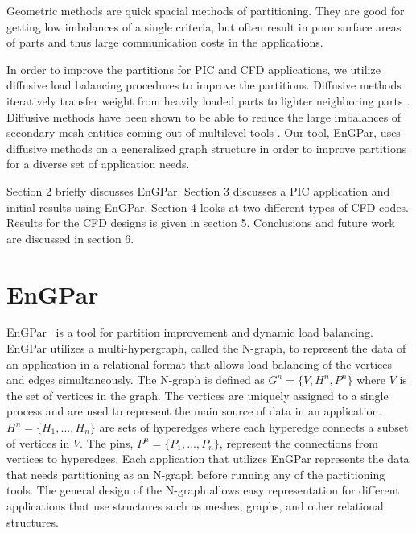 \documentclass[conference]{IEEEtran}
\begin{document}
Geometric methods are quick spacial methods of partitioning. They are good for getting low
imbalances of a single criteria, but often result in poor surface areas of parts and thus large
communication costs in the applications.

In order to improve the partitions for PIC and CFD applications, we utilize diffusive
load balancing procedures to improve the partitions. Diffusive methods iteratively transfer
weight from heavily loaded parts to lighter neighboring parts
\cite{cybenko1989dynamic,subramanian1994analysis}. Diffusive methods have been shown to be
able to reduce the large imbalances of secondary mesh entities coming out of multilevel
tools \cite{SmithParma2015}. Our tool, EnGPar, uses diffusive methods on a
generalized graph structure in order to improve partitions for a diverse set of application needs.

Section 2 briefly discusses EnGPar. Section 3 discusses a PIC application and initial results
using EnGPar. Section 4 looks at two different types of CFD codes. Results for the CFD
designs is given in section 5. Conclusions and future work are discussed in section 6.

\section{EnGPar}


EnGPar~\cite{engparSC17,engpar_github} is a tool for partition improvement and
dynamic load balancing.
EnGPar utilizes a multi-hypergraph, called the N-graph, to represent the data of
an application in a relational format that allows load balancing of the vertices
and edges simultaneously.
The N-graph is defined as $G^n = \{V, H^n, P^n\}$ where
$V$ is the set of vertices in the graph. The vertices are uniquely assigned to a single
process and are used to represent the main source of data in an application.
$H^n = \{H_1, ..., H_n\}$ are sets of hyperedges where each hyperedge connects a
subset of vertices in $V$. The pins, $P^n = \{P_1,...,P_n\}$, represent the connections from
vertices to hyperedges. Each application that utilizes EnGPar represents the data
that needs partitioning as an N-graph before running any of the partitioning tools.
The general design of the N-graph allows easy representation for different applications
that use structures such as meshes, graphs, and other relational structures.
\end{document}
